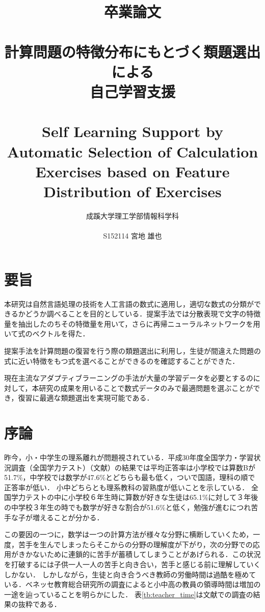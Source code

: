 \documentclass[a4j,11pt,report]{jsbook}
\title{卒業論文\\　\vspace{3em}\\{\huge #1}\\　\\#2\vspace{15em}}%
\author{{\huge 成蹊大学理工学部情報科学科}\\　\\{\huge #3}}%
\date{}
\newcommand{\frontpage}[3]{%
\title{卒業論文\\　\vspace{3em}\\{\huge #1}\\　\\#2\vspace{15em}}%
\author{{\huge 成蹊大学理工学部情報科学科}\\　\\{\huge #3}}%
\date{}
\maketitle

\thispagestyle{empty}


}
\begin{document}
\frontpage  %
{計算問題の特徴分布にもとづく類題選出による\\自己学習支援}
{Self Learning Support by Automatic Selection of Calculation Exercises based on Feature Distribution of Exercises}
{S152114 宮地 雄也}



\chapter*{要旨}
\thispagestyle{empty}

本研究は自然言語処理の技術を人工言語の数式に適用し，適切な数式の分類ができるかどうか調べることを目的としている．提案手法では分散表現で文字の特徴量を抽出したのちその特徴量を用いて，さらに再帰ニューラルネットワークを用いて式のベクトルを得た．

提案手法を計算問題の復習を行う際の類題選出に利用し，生徒が間違えた問題の式に近い特徴をもつ式を選べることができるのを確認することができた．

現在主流なアダプティブラーニングの手法が大量の学習データを必要とするのに対して，本研究の成果を用いることで数式データのみで最適問題を選ぶことができ，復習に最適な類題選出を実現可能である．


\tableofcontents
\thispagestyle{empty}

\thispagestyle{plain}
\setcounter{page}{1}

\chapter{序論 \label{ch:introduction}}

昨今，小・中学生の理系離れが問題視されている．平成30年度全国学力・学習状況調査（全国学力テスト）（文献\cite{result_zennkoku_test}）の結果では平均正答率は小学校では算数Bが51.7\%，中学校では数学が47.6\%とどちらも最も低く，ついで国語，理科の順で正答率が低い．
小中どちらとも理系教科の習熟度が低いことを示している．
全国学力テストの中に小学校６年生時に算数が好きな生徒は65.1\%に対して３年後の中学校３年生の時でも数学が好きな割合が51.6\%と低く，勉強が進むにつれ苦手な子が増えることが分かる．

この要因の一つに，数学は一つの計算方法が様々な分野に横断していくため，一度，苦手を生んでしまったらそこからの分野の理解度が下がり，次の分野での応用がきかないために連鎖的に苦手が蓄積してしまうことがあげられる．この状況を打破するには子供一人一人の苦手と向き合い，苦手と感じる前に理解していくしかない．
しかしながら，生徒と向き合うべき教師の労働時間は過酷を極めている．ベネッセ教育総合研究所の調査によると小中高の教員の領導時間は増加の一途を辿っていることを明らかにした．
表\ref{tb:teacher_time}は文献\cite{benesse_DateBook}での調査の結果の抜粋である．
\end{document}
